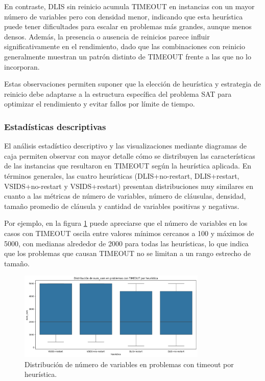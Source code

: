 En contraste, DLIS sin reinicio acumula TIMEOUT en instancias con un mayor número de variables pero con densidad menor, indicando que esta heurística puede tener dificultades para escalar en problemas más grandes, aunque menos densos. Además, la presencia o ausencia de reinicios parece influir significativamente en el rendimiento, dado que las combinaciones con reinicio generalmente muestran un patrón distinto de TIMEOUT frente a las que no lo incorporan. 

Estas observaciones permiten suponer que la elección de heurística y estrategia de reinicio debe adaptarse a la estructura específica del problema SAT para optimizar el rendimiento y evitar fallos por límite de tiempo.

\subsubsection{Estad\'isticas descriptivas}

El análisis estadístico descriptivo y las visualizaciones mediante diagramas de caja permiten observar con mayor detalle cómo se distribuyen las características de las instancias que resultaron en TIMEOUT según la heurística aplicada. En términos generales, las cuatro heurísticas (DLIS+no-restart, DLIS+restart, VSIDS+no-restart y VSIDS+restart) presentan distribuciones muy similares en cuanto a las métricas de número de variables, número de cláusulas, densidad, tamaño promedio de cláusula y cantidad de variables positivas y negativas.

Por ejemplo, en la figura \ref{fig:num-vars-timeout-x-heuristica} puede apreciarse que el número de variables en los casos con TIMEOUT oscila entre valores mínimos cercanos a 100 y máximos de 5000, con medianas alrededor de 2000 para todas las heurísticas, lo que indica que los problemas que causan TIMEOUT no se limitan a un rango estrecho de tamaño.

\begin{figure}[ht]
    \centering
    \includegraphics[width=0.8\textwidth]{Graphics/num_vars_timeout_x_heuristica.png}
    \caption{Distribuci\'on de n\'umero de variables en problemas con timeout por heur\'istica.}
    \label{fig:num-vars-timeout-x-heuristica}
\end{figure}

